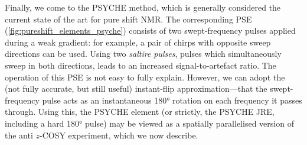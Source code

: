Finally, we come to the PSYCHE method, which is generally considered the current state of the art for pure shift NMR.\autocite{Foroozandeh2014ACIE}
The corresponding PSE (\cref{fig:pureshift_elements_psyche}) consists of two swept-frequency pulses applied during a weak gradient: for example, a pair of chirps with opposite sweep directions can be used.
Using two \textit{saltire pulses}, pulses which simultaneously sweep in both directions, leads to an increased signal-to-artefact ratio\autocite{Foroozandeh2018CEJ}.
The operation of this PSE is not easy to fully explain\autocite{Foroozandeh2020JMR}. However, we can adopt the (not fully accurate, but still useful) instant-flip approximation\autocite{Zwahlen1997JACS,Kupce2007JMR}---that the swept-frequency pulse acts as an instantaneous \ang{180} rotation on each frequency it passes through.
Using this, the PSYCHE element (or strictly, the PSYCHE JRE, including a hard \ang{180} pulse) may be viewed as a spatially parallelised version of the anti $z$-COSY experiment\autocite{Oschkinat1986JMR,Pell2007MRC}, which we now describe.
